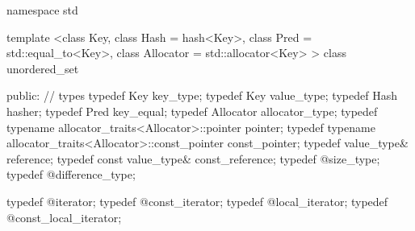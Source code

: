 %
\begin{codeblock}
namespace std {
  template <class Key,
            class Hash  = hash<Key>,
            class Pred  = std::equal_to<Key>,
            class Allocator = std::allocator<Key> >
  class unordered_set
  {
  public:
    // types
    typedef Key                                                 key_type;
    typedef Key                                                 value_type;
    typedef Hash                                                hasher;
    typedef Pred                                                key_equal;
    typedef Allocator                                           allocator_type;
    typedef typename allocator_traits<Allocator>::pointer       pointer;
    typedef typename allocator_traits<Allocator>::const_pointer const_pointer;
    typedef value_type&                                         reference;
    typedef const value_type&                                   const_reference;
    typedef @\impdef@                              size_type;
    typedef @\impdef@                              difference_type;

    typedef @\impdef@                              iterator;
    typedef @\impdef@                              const_iterator;
    typedef @\impdef@                              local_iterator;
    typedef @\impdef@                              const_local_iterator;

}}
\end{codeblock}
